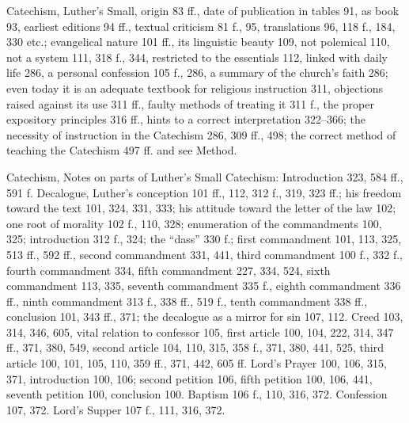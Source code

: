 Catechism, Luther’s Small, origin 83 ff., date of publication in tables 91, as book 93, earliest editions 94 ff., textual criticism 81 f., 95, translations 96, 118 f., 184, 330 etc.; evangelical nature 101 ff., its linguistic beauty 109, not polemical 110, not a system 111, 318 f., 344, restricted to the essentials 112, linked with daily life 286, a personal confession 105 f., 286, a summary of the church’s faith 286; even today it is an adequate textbook for religious instruction 311, objections raised against its use 311 ff., faulty methods of treating it 311 f., the proper expository principles 316 ff., hints to a correct interpretation 322–366; the necessity of instruction in the Catechism 286, 309 ff., 498; the correct method of teaching the Catechism 497 ff. and see Method.

Catechism, Notes on parts of Luther’s Small Catechism: Introduction 323, 584 ff., 591 f. Decalogue, Luther’s conception 101 ff., 112, 312 f., 319, 323 ff.; his freedom toward the text 101, 324, 331, 333; his attitude toward the letter of the law 102; one root of morality 102 f., 110, 328; enumeration of the commandments 100, 325; introduction 312 f., 324; the “dass” 330 f.; first commandment 101, 113, 325, 513 ff., 592 ff., second commandment 331, 441, third commandment 100 f., 332 f., fourth commandment 334, fifth commandment 227, 334, 524, sixth commandment 113, 335, seventh commandment 335 f., eighth commandment 336 ff., ninth commandment 313 f., 338 ff., 519 f., tenth commandment 338 ff., conclusion 101, 343 ff., 371; the decalogue as a mirror for sin 107, 112. Creed 103, 314, 346, 605, vital relation to confessor 105, first article 100, 104, 222, 314, 347 ff., 371, 380, 549, second article 104, 110, 315, 358 f., 371, 380, 441, 525, third article 100, 101, 105, 110, 359 ff., 371, 442, 605 ff. Lord’s Prayer 100, 106, 315, 371, introduction 100, 106; second petition 106, fifth petition 100, 106, 441, seventh petition 100, conclusion 100. Baptism
106 f., 110, 316, 372. Confession 107, 372. Lord’s Supper 107 f., 111, 316, 372.

